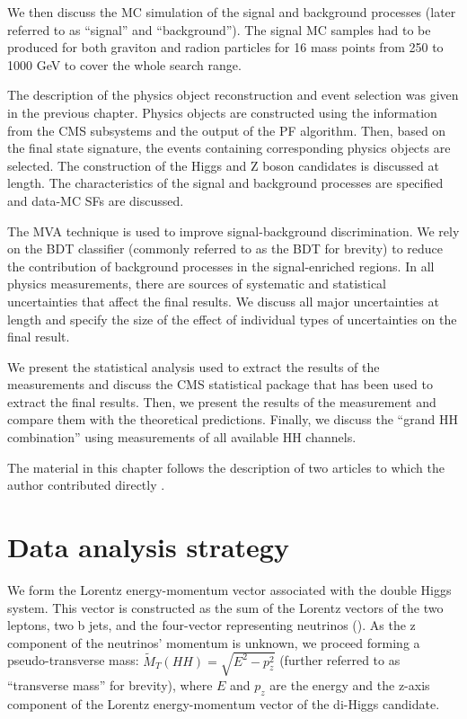 We then discuss the MC simulation of the signal and background processes (later referred to as ``signal'' and ``background''). The signal MC samples had to be produced for both graviton and radion particles for 16 mass points from 250 to 1000 GeV to cover the whole search range. 

The description of the physics object reconstruction and event selection was given in the previous chapter. Physics objects are constructed using the information from the CMS subsystems and the output of the PF algorithm. Then, based on the final state signature, the events containing corresponding physics objects are selected. The construction of the Higgs and Z boson candidates is discussed at length. The characteristics of the signal and background processes are specified and data-MC SFs are discussed.

The MVA technique is used to improve signal-background discrimination. We rely on the BDT classifier (commonly referred to as the BDT for brevity) to reduce the contribution of background processes in the signal-enriched regions. In all physics measurements, there are sources of systematic and statistical uncertainties that affect the final results. We discuss all major uncertainties at length and specify the size of the effect of individual types of uncertainties on the final result. 

We present the statistical analysis used to extract the results of the measurements and discuss the CMS statistical package that has been used to extract the final results. Then, we present the results of the measurement and compare them with the theoretical predictions. Finally, we discuss the ``grand HH combination'' using measurements of all available HH channels.

The material in this chapter follows the description of two articles to which the author contributed directly \cite{bbZZAN, CMS-PAS-HIG-17-032}.

\section{Data analysis strategy}
\label{sec:strategy}
We form the Lorentz energy-momentum vector associated with the double Higgs system. This vector is constructed as the sum of the Lorentz vectors of the two leptons, two b jets, and the four-vector representing neutrinos (\PTslash). As the z component of the neutrinos' momentum is unknown, we proceed forming a pseudo-transverse mass:
$\tilde{M}_T(HH) = \sqrt{E^2 - p_{z}^2}$ (further referred to as ``transverse mass'' for brevity), where $E$ and $p_z$ are the energy and the z-axis component of the Lorentz energy-momentum vector of the di-Higgs candidate.


